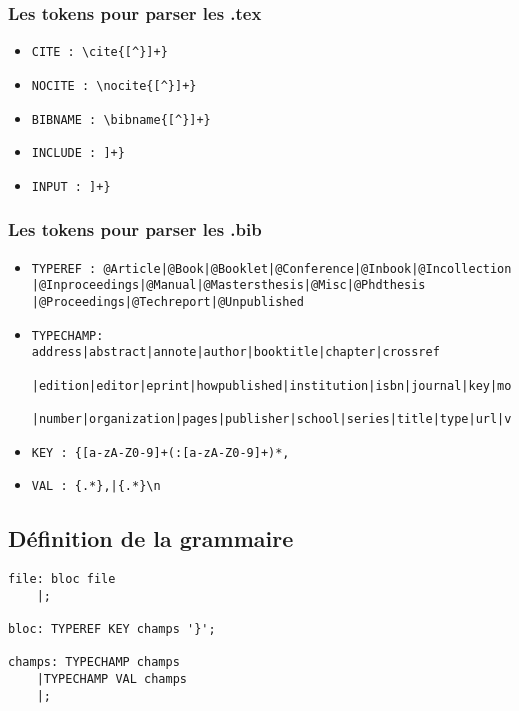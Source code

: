 \documentclass[hidelinks, a4paper,11pt,twoside,final]{article}
\begin{document}
\subsubsection {Les tokens pour parser les .tex}
\begin{itemize}
 \item \begin{verbatim}CITE : \cite{[^}]+}\end{verbatim}
 
 \item \begin{verbatim}NOCITE : \nocite{[^}]+}\end{verbatim}
 
 \item \begin{verbatim}BIBNAME : \bibname{[^}]+}\end{verbatim}
 
 \item \begin{verbatim}INCLUDE : ]+}\end{verbatim}
 
 \item \begin{verbatim}INPUT : ]+}\end{verbatim}
\end{itemize} 

\subsubsection {Les tokens pour parser les .bib}
\begin{itemize}
 
 \item \begin{verbatim}TYPEREF : @Article|@Book|@Booklet|@Conference|@Inbook|@Incollection 
|@Inproceedings|@Manual|@Mastersthesis|@Misc|@Phdthesis
|@Proceedings|@Techreport|@Unpublished\end{verbatim}

 \item  \begin{verbatim}TYPECHAMP: address|abstract|annote|author|booktitle|chapter|crossref
 |edition|editor|eprint|howpublished|institution|isbn|journal|key|month|note
 |number|organization|pages|publisher|school|series|title|type|url|volume|year\end{verbatim}
 
 \item \begin{verbatim}KEY : {[a-zA-Z0-9]+(:[a-zA-Z0-9]+)*,\end{verbatim}
 
 \item \begin{verbatim}VAL : {.*},|{.*}\n\end{verbatim}
\end{itemize} 

\subsection{Définition de la grammaire}

\begin{lstlisting}
file: bloc file
    |;

bloc: TYPEREF KEY champs '}';

champs: TYPECHAMP champs
    |TYPECHAMP VAL champs
    |;
\end{lstlisting}
\end{document}
